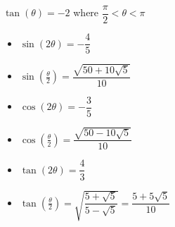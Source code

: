 {$\tan(\theta) = -2$ where $\dfrac{\pi}{2} < \theta < \pi$}
{\begin{itemize}
\item $\sin(2\theta) = -\dfrac{4}{5}$
\item $\sin\left(\frac{\theta}{2}\right) = \dfrac{\sqrt{50+10\sqrt{5}}}{10}$ 
\item $\cos(2\theta) = -\dfrac{3}{5}$
\item $\cos\left(\frac{\theta}{2}\right)= \dfrac{\sqrt{50-10\sqrt{5}}}{10}$ 
\item $\tan(2\theta)=\dfrac{4}{3}$
\item $\tan\left(\frac{\theta}{2}\right) =  \sqrt{\dfrac{5+\sqrt{5}}{5-\sqrt{5}}} =\dfrac{5+5\sqrt{5}}{10}$
\end{itemize}
}
